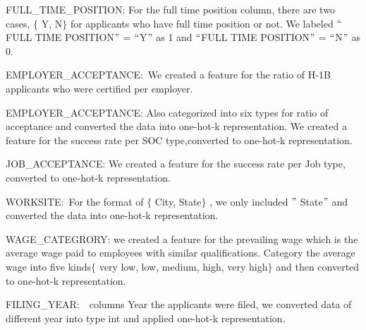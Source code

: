 \documentclass[12pt]{article}
\begin{document}
\begin{justify}
FULL\_TIME\_POSITION: For the full time position column, there are two cases, $ \{ $ Y, N$ \} $  for applicants who have full time position or not. We labeled $``$FULL TIME POSITION$"$  = $``$Y$"$  as 1 and $``$FULL TIME POSITION$"$  = $``$N$"$  as 0.
\end{justify}\par

\begin{justify}
EMPLOYER\_ACCEPTANCE:\  We created a feature for the ratio of H-1B applicants who were certified per employer. 
\end{justify}\par

\begin{justify}
EMPLOYER\_ACCEPTANCE: Also categorized into six types for ratio of acceptance and converted the data into one-hot-k representation. We created a feature for the success rate per SOC type,converted to one-hot-k representation.
\end{justify}\par

\begin{justify}
JOB\_ACCEPTANCE: We created a feature for the success rate per Job type, converted to one-hot-k representation.
\end{justify}\par

\begin{justify}
WORKSITE:\ For the format of $ \{ $ City, State$ \} $ ,  we only included $"$ State$"$  and converted the data into one-hot-k representation.
\end{justify}\par

\begin{justify}
WAGE\_CATEGRORY: we created a feature for the prevailing wage which is the average wage paid to employees with similar qualifications. Category the average wage into five kinds$ \{ $ very low, low, medium, high, very high$ \} $  and then converted to one-hot-k representation. 
\end{justify}\par

\begin{justify}
FILING\_YEAR:\ \ columns Year the applicants were filed,  we converted data of different year into type int and applied one-hot-k representation.
\end{justify}\par
\end{document}
